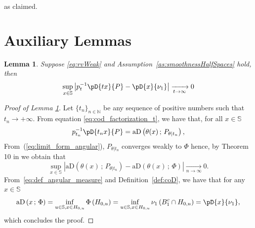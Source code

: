 \documentclass{article}
\numberwithin{equation}{section}
\newtheorem{lemma}{Lemma}[section]
\newcommand{\N}{\mathbb{N}}
\newcommand{\sphere}{\mathbb{S}}
\newcommand{\coD}[2]{\pD{#1}{#2}}
\newcommand{\aD}[2]{{\mathrm{aD}}\left({#1}\,;\,{#2}\right)}
\begin{document}
as claimed.


\section{Auxiliary Lemmas}\label{sec:appendix:auxiliary_lemmas}
%

\begin{lemma}\label{lem:uniform_convergence_sphere} Suppose
    \eqref{eq:rvWeak} and Assumption~\ref{as:smoothnessHalfSpaces}
    hold, then
    \begin{equation*}
        \sup_{x\in\sphere} \left| p_t^{-1}\coD{tx}{P}-\coD{x}{\nu_1}
        \right|\xrightarrow[t\to\infty]{} 0
    \end{equation*}
\end{lemma}
\begin{proof}[Proof of Lemma \ref{lem:uniform_convergence_sphere}]
    Let \(\{t_n\}_{n\in\N}\) be any sequence of positive numbers such
    that \(t_n\to +\infty\).
    From equation \eqref{eq:cod_factorization_t}, we have that, for
    all \(x\in\sphere\)
    \begin{equation*}
        p_{t_n}^{-1}\coD{t_nx}{P} = \aD{\theta(x)}{P_{\theta|t_n}},
    \end{equation*}
    From~(\ref{eq:limit_form_angular}),
    \(P_{\theta|t_n}\)
    converges weakly to $\Phi$ %
    hence, by Theorem 10 in \cite{nagy2024theoretical} we obtain that
    \begin{equation*}
        \sup_{x\in\sphere}|\aD{\theta(x)}{P_{\theta|t_n}} -
        \aD{\theta(x)}{\Phi}|\xrightarrow[n\to\infty]{} 0.
    \end{equation*}
    From~\eqref{eq:def_angular_measure}
    and Definition~\ref{def:coD}, we have that for any \(x\in\sphere\)
    \begin{equation*}
        \aD{x}{\Phi} = \inf_{u\in\sphere,x\in
        H_{0,u}}\Phi\left(H_{0,u}\right) =
        \inf_{u\in\sphere,x\in H_{0,u}}{\nu_1\left(B_1^c\cap
        H_{0,u}\right)}=\coD{x}{\nu_1},
    \end{equation*}
    which concludes the proof.
\end{proof}
\end{document}
